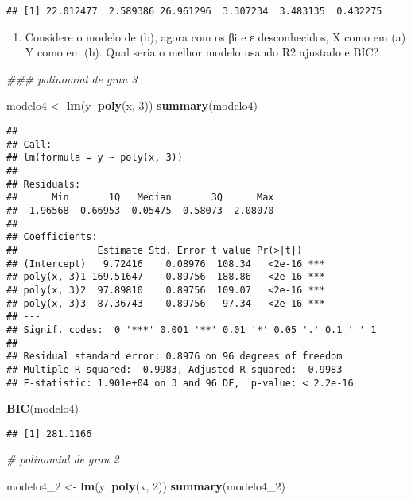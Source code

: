 \documentclass[]{article}
\newenvironment{Shaded}{\begin{snugshade}}{\end{snugshade}}
\newcommand{\CommentTok}[1]{\textcolor[rgb]{0.56,0.35,0.01}{\textit{#1}}}
\newcommand{\DecValTok}[1]{\textcolor[rgb]{0.00,0.00,0.81}{#1}}
\newcommand{\KeywordTok}[1]{\textcolor[rgb]{0.13,0.29,0.53}{\textbf{#1}}}
\newcommand{\NormalTok}[1]{#1}
\newcommand{\OperatorTok}[1]{\textcolor[rgb]{0.81,0.36,0.00}{\textbf{#1}}}
\newcommand{\StringTok}[1]{\textcolor[rgb]{0.31,0.60,0.02}{#1}}
\providecommand{\tightlist}{%
  \setlength{\itemsep}{0pt}\setlength{\parskip}{0pt}}
\begin{document}
\begin{verbatim}
## [1] 22.012477  2.589386 26.961296  3.307234  3.483135  0.432275
\end{verbatim}

\begin{enumerate}
\def\labelenumi{(\alph{enumi})}
\setcounter{enumi}{2}
\tightlist
\item
  Considere o modelo de (b), agora com os βi e ε desconhecidos, X como
  em (a) Y como em (b). Qual seria o melhor modelo usando R2 ajustado e
  BIC?
\end{enumerate}

\begin{Shaded}
\begin{Highlighting}[]
\CommentTok{### polinomial de grau 3}
 
\NormalTok{modelo4 <-}\StringTok{ }\KeywordTok{lm}\NormalTok{(y}\OperatorTok{~}\KeywordTok{poly}\NormalTok{(x, }\DecValTok{3}\NormalTok{))}
\KeywordTok{summary}\NormalTok{(modelo4)}
\end{Highlighting}
\end{Shaded}

\begin{verbatim}
## 
## Call:
## lm(formula = y ~ poly(x, 3))
## 
## Residuals:
##      Min       1Q   Median       3Q      Max 
## -1.96568 -0.66953  0.05475  0.58073  2.08070 
## 
## Coefficients:
##              Estimate Std. Error t value Pr(>|t|)    
## (Intercept)   9.72416    0.08976  108.34   <2e-16 ***
## poly(x, 3)1 169.51647    0.89756  188.86   <2e-16 ***
## poly(x, 3)2  97.89810    0.89756  109.07   <2e-16 ***
## poly(x, 3)3  87.36743    0.89756   97.34   <2e-16 ***
## ---
## Signif. codes:  0 '***' 0.001 '**' 0.01 '*' 0.05 '.' 0.1 ' ' 1
## 
## Residual standard error: 0.8976 on 96 degrees of freedom
## Multiple R-squared:  0.9983, Adjusted R-squared:  0.9983 
## F-statistic: 1.901e+04 on 3 and 96 DF,  p-value: < 2.2e-16
\end{verbatim}

\begin{Shaded}
\begin{Highlighting}[]
\KeywordTok{BIC}\NormalTok{(modelo4)}
\end{Highlighting}
\end{Shaded}

\begin{verbatim}
## [1] 281.1166
\end{verbatim}

\begin{Shaded}
\begin{Highlighting}[]
\CommentTok{# polinomial de grau 2}

\NormalTok{modelo4_}\DecValTok{2}\NormalTok{ <-}\StringTok{ }\KeywordTok{lm}\NormalTok{(y}\OperatorTok{~}\KeywordTok{poly}\NormalTok{(x, }\DecValTok{2}\NormalTok{))}
\KeywordTok{summary}\NormalTok{(modelo4_}\DecValTok{2}\NormalTok{)}
\end{Highlighting}
\end{Shaded}
\end{document}
